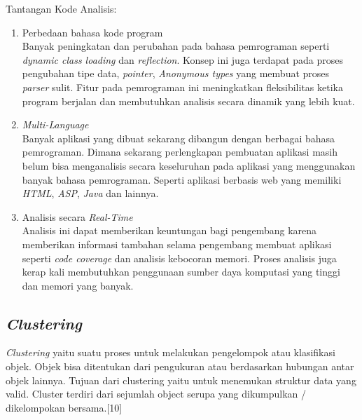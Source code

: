 Tantangan Kode Analisis:
\begin{enumerate}[leftmargin=1.3cm]
	\item Perbedaan bahasa kode program\\
	Banyak peningkatan dan perubahan pada bahasa pemrograman seperti \textit{dynamic class loading} dan \textit{reflection}. Konsep ini juga terdapat pada proses pengubahan tipe data, \textit{pointer}, \textit{Anonymous types} yang membuat proses \textit{parser} sulit. Fitur pada pemrograman ini meningkatkan fleksibilitas ketika program berjalan dan membutuhkan analisis secara dinamik yang lebih kuat.
	\item \textit{Multi-Language}\\
	Banyak aplikasi yang dibuat sekarang dibangun dengan berbagai bahasa pemrograman. Dimana sekarang perlengkapan pembuatan aplikasi masih belum bisa menganalisis secara keseluruhan pada aplikasi yang menggunakan banyak bahasa pemrograman. Seperti aplikasi berbasis web yang memiliki \textit{HTML}, \textit{ASP}, \textit{Java} dan lainnya.
	\item Analisis secara \textit{Real-Time}\\
	Analisis ini dapat memberikan keuntungan bagi pengembang karena memberikan informasi tambahan selama pengembang membuat aplikasi seperti \textit{code coverage} dan analisis kebocoran memori. Proses analisis juga kerap kali membutuhkan penggunaan sumber daya komputasi yang tinggi dan memori yang banyak.\\
\end{enumerate}

\subsection{\textit{Clustering}}
\textit{Clustering} yaitu suatu proses untuk melakukan pengelompok atau klasifikasi objek. Objek bisa ditentukan dari pengukuran atau berdasarkan hubungan antar objek lainnya. Tujuan dari clustering yaitu untuk  menemukan struktur data yang valid. Cluster terdiri dari sejumlah object serupa yang dikumpulkan / dikelompokan bersama.[10]

